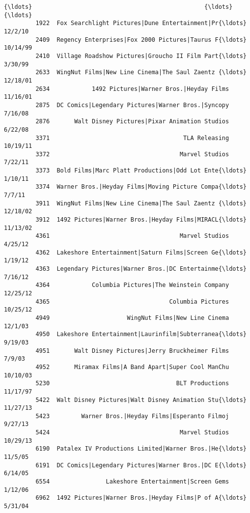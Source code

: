 \documentclass[11pt]{article}
\begin{document}
\begin{Verbatim}[commandchars=\\\{\}]
         {\ldots}                                                 {\ldots}          {\ldots}   
         1922  Fox Searchlight Pictures|Dune Entertainment|Pr{\ldots}      12/2/10   
         2409  Regency Enterprises|Fox 2000 Pictures|Taurus F{\ldots}     10/14/99   
         2410  Village Roadshow Pictures|Groucho II Film Part{\ldots}      3/30/99   
         2633  WingNut Films|New Line Cinema|The Saul Zaentz {\ldots}     12/18/01   
         2634            1492 Pictures|Warner Bros.|Heyday Films     11/16/01   
         2875  DC Comics|Legendary Pictures|Warner Bros.|Syncopy      7/16/08   
         2876       Walt Disney Pictures|Pixar Animation Studios      6/22/08   
         3371                                      TLA Releasing     10/19/11   
         3372                                     Marvel Studios      7/22/11   
         3373  Bold Films|Marc Platt Productions|Odd Lot Ente{\ldots}      1/10/11   
         3374  Warner Bros.|Heyday Films|Moving Picture Compa{\ldots}       7/7/11   
         3911  WingNut Films|New Line Cinema|The Saul Zaentz {\ldots}     12/18/02   
         3912  1492 Pictures|Warner Bros.|Heyday Films|MIRACL{\ldots}     11/13/02   
         4361                                     Marvel Studios      4/25/12   
         4362  Lakeshore Entertainment|Saturn Films|Screen Ge{\ldots}      1/19/12   
         4363  Legendary Pictures|Warner Bros.|DC Entertainme{\ldots}      7/16/12   
         4364            Columbia Pictures|The Weinstein Company     12/25/12   
         4365                                  Columbia Pictures     10/25/12   
         4949                      WingNut Films|New Line Cinema      12/1/03   
         4950  Lakeshore Entertainment|Laurinfilm|Subterranea{\ldots}      9/19/03   
         4951       Walt Disney Pictures|Jerry Bruckheimer Films       7/9/03   
         4952       Miramax Films|A Band Apart|Super Cool ManChu     10/10/03   
         5230                                    BLT Productions     11/17/97   
         5422  Walt Disney Pictures|Walt Disney Animation Stu{\ldots}     11/27/13   
         5423         Warner Bros.|Heyday Films|Esperanto Filmoj      9/27/13   
         5424                                     Marvel Studios     10/29/13   
         6190  Patalex IV Productions Limited|Warner Bros.|He{\ldots}      11/5/05   
         6191  DC Comics|Legendary Pictures|Warner Bros.|DC E{\ldots}      6/14/05   
         6554                Lakeshore Entertainment|Screen Gems      1/12/06   
         6962  1492 Pictures|Warner Bros.|Heyday Films|P of A{\ldots}      5/31/04   
         

\end{Verbatim}
\end{document}
